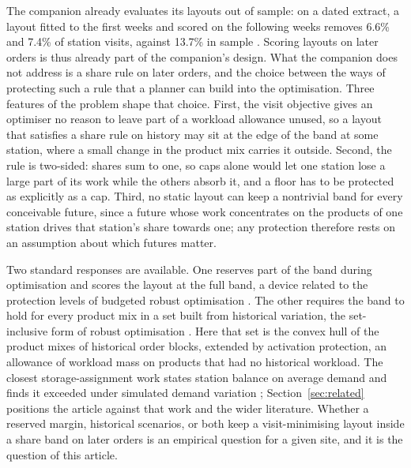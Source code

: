 The companion already evaluates its layouts out of sample: on a dated extract, a layout fitted to the first weeks and scored on the following weeks removes 6.6\% and 7.4\% of station visits, against 13.7\% in sample \citep{belul_companion}. Scoring layouts on later orders is thus already part of the companion's design. What the companion does not address is a share rule on later orders, and the choice between the ways of protecting such a rule that a planner can build into the optimisation. Three features of the problem shape that choice. First, the visit objective gives an optimiser no reason to leave part of a workload allowance unused, so a layout that satisfies a share rule on history may sit at the edge of the band at some station, where a small change in the product mix carries it outside. Second, the rule is two-sided: shares sum to one, so caps alone would let one station lose a large part of its work while the others absorb it, and a floor has to be protected as explicitly as a cap. Third, no static layout can keep a nontrivial band for every conceivable future, since a future whose work concentrates on the products of one station drives that station's share towards one; any protection therefore rests on an assumption about which futures matter.

Two standard responses are available. One reserves part of the band during optimisation and scores the layout at the full band, a device related to the protection levels of budgeted robust optimisation \citep{bertsimas2004price}. The other requires the band to hold for every product mix in a set built from historical variation, the set-inclusive form of robust optimisation \citep{soyster1973convex}. Here that set is the convex hull of the product mixes of historical order blocks, extended by activation protection, an allowance of workload mass on products that had no historical workload. The closest storage-assignment work states station balance on average demand and finds it exceeded under simulated demand variation \citep{winkelmann2025integrated}; Section~\ref{sec:related} positions the article against that work and the wider literature. Whether a reserved margin, historical scenarios, or both keep a visit-minimising layout inside a share band on later orders is an empirical question for a given site, and it is the question of this article.

